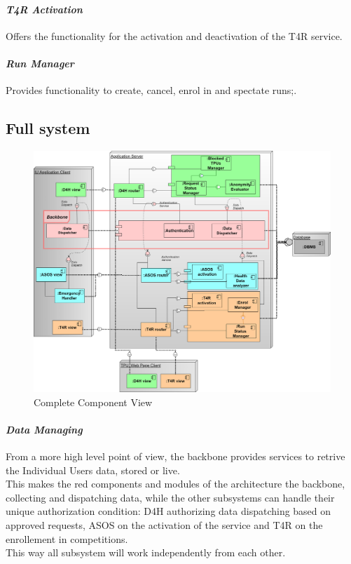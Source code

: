 \paragraph{\textit{T4R Activation}} Offers the functionality for the activation and deactivation of the T4R service.
\paragraph{\textit{Run Manager}} Provides functionality to create, cancel, enrol in and spectate runs;.
\clearpage
\subsection{Full system}
\begin{figure}[H]
\label{fig:ComponentDiagram}
\caption{Complete Component View}
\centering
\includegraphics[width = \textwidth]{sections/architecturalDesign/ComponentDiagram.png}
\end{figure}
\paragraph{\textit{Data Managing}} From a more high level point of view, the backbone provides services to retrive the Individual Users data, stored or live. \\
This makes the red components and modules of the architecture the backbone, collecting and dispatching data, while the other subsystems can handle their unique authorization condition: D4H authorizing data dispatching based on approved requests, ASOS on the activation of the service and T4R on the enrollement in competitions. \\
This way all subsystem will work independently from each other.%
\clearpage
